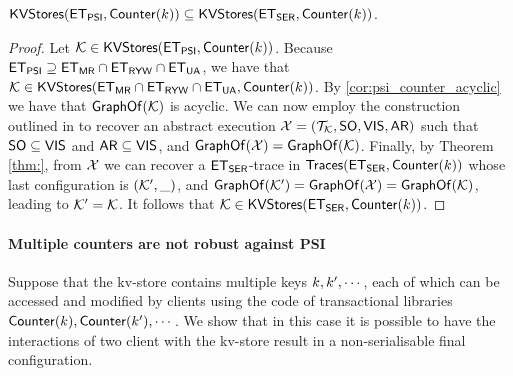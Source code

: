 \begin{corollary}
$\mathsf{KVStores}(\mathsf{ET}_{\mathsf{PSI}}, \mathsf{Counter}(k)) \subseteq \mathsf{KVStores}(\mathsf{ET}_{\mathsf{SER}}, \mathsf{Counter}(k))$. 
\end{corollary}

\begin{proof}
Let $\mathcal{K} \in \mathsf{KVStores}(\mathsf{ET}_{\mathsf{PSI}}, \mathsf{Counter}(k))$. Because $\mathsf{ET}_{\mathsf{PSI}} \supseteq \mathsf{ET}_{\mathsf{MR}} \cap \mathsf{ET}_{\mathsf{RYW}} \cap \mathsf{ET}_{\mathsf{UA}}$, 
we have that $\mathcal{K} \in \mathsf{KVStores}(\mathsf{ET}_{\mathsf{MR}} \cap \mathsf{ET}_{\mathsf{RYW}} \cap \mathsf{ET}_{\mathsf{UA}}, \mathsf{Counter}(k))$. 
By \cref{cor:psi_counter_acyclic} we have that $\mathsf{GraphOf}(\mathcal{K})$ is acyclic. We can now employ the construction 
outlined in \cite{?,laws} to recover an abstract execution $\mathcal{X} = (\mathcal{T}_{\mathcal{K}}, \mathsf{SO}, \mathsf{VIS}, \mathsf{AR})$ such that $\mathsf{SO} \subseteq \mathsf{VIS}$ and $\mathsf{AR} \subseteq \mathsf{VIS}$, 
and $\mathsf{GraphOf}(\mathcal{X}) = \mathsf{GraphOf}(\mathcal{K})$.
Finally, by Theorem \ref{thm:}, from $\mathcal{X}$ we can recover a $\mathsf{ET}_{\mathsf{SER}}$-trace in 
$\mathsf{Traces}(\mathsf{ET}_{\mathsf{SER}}, \mathsf{Counter}(k))$
whose last configuration is $(\mathcal{K}', \_)$, and 
$\mathsf{GraphOf}(\mathcal{K}') = \mathsf{GraphOf}(\mathcal{X}) = \mathsf{GraphOf}(\mathcal{K})$, leading to $\mathcal{K}' = \mathcal{K}$. It follows that $\mathcal{K} \in 
\mathsf{KVStores}(\mathsf{ET}_{\mathsf{SER}}, \mathsf{Counter}(k))$.
\end{proof}

\paragraph{Multiple counters are not robust against PSI}
Suppose that the kv-store contains multiple keys $k, k', \cdots$, each of which 
can be accessed and modified by clients using the code of transactional libraries 
$\mathsf{Counter}(k), \mathsf{Counter}(k'), \cdots$. We show that in this
 case it is possible to have the interactions of two client with the kv-store result 
 in  a non-serialisable final configuration. 
 
